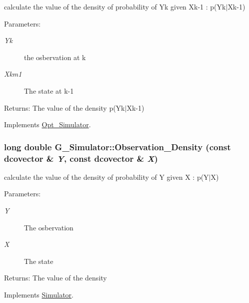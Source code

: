 calculate the value of the density of probability of Yk given Xk-1 : p(Yk$|$Xk-1) 

\begin{Desc}
\item[Parameters:]
\begin{description}
\item[{\em Yk}]the osbervation at k \item[{\em Xkm1}]The state at k-1\end{description}
\end{Desc}
\begin{Desc}
\item[Returns:]The value of the density p(Yk$|$Xk-1) \end{Desc}


Implements \hyperlink{class_opt___simulator_e72d4709998087317635a94c709d71ba}{Opt\_\-Simulator}.\hypertarget{class_g___simulator_6f42783322c20a0b91fab9f1e6d54363}{
\subsubsection[{Observation\_\-Density}]{\setlength{\rightskip}{0pt plus 5cm}long double G\_\-Simulator::Observation\_\-Density (const dcovector \& {\em Y}, \/  const dcovector \& {\em X})}}
\label{class_g___simulator_6f42783322c20a0b91fab9f1e6d54363}


calculate the value of the density of probability of Y given X : p(Y$|$X) 

\begin{Desc}
\item[Parameters:]
\begin{description}
\item[{\em Y}]The osbervation \item[{\em X}]The state\end{description}
\end{Desc}
\begin{Desc}
\item[Returns:]The value of the density \end{Desc}


Implements \hyperlink{class_simulator_75b0dfb5b0b88346ecb9f7da4fbd91f1}{Simulator}.